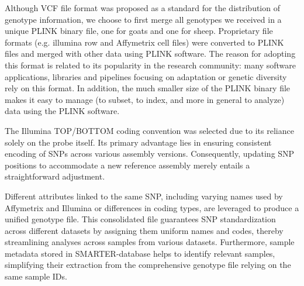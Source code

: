 \documentclass[a4paper,num-refs,gigabyte]{oup-contemporary}
\begin{document}
Although VCF\citep{Danecek2011} file format was proposed as a standard for the distribution of genotype information, we choose to first merge all genotypes we received in a unique PLINK binary file, one for goats and one for sheep. Proprietary file formats (e.g. illumina row and Affymetrix cell files) were converted to PLINK files and merged with other data using PLINK\citep{Purcell2007} software. The reason for adopting this format is related to its popularity in the research community: many software applications, libraries and pipelines focusing on adaptation or genetic diversity rely on this format. In addition, the much smaller size of the PLINK binary file makes it easy to manage (to subset, to index, and more in general to analyze) data using the PLINK software.

The Illumina TOP/BOTTOM coding convention was selected due to its reliance solely on the probe itself\citep{IlluminaTOP}. Its primary advantage lies in ensuring consistent encoding of SNPs across various assembly versions. Consequently, updating SNP positions to accommodate a new reference assembly merely entails a straightforward adjustment.

Different attributes linked to the same SNP, including varying names used by Affymetrix and Illumina or differences in coding types, are leveraged to produce a unified genotype file. This consolidated file guarantees SNP standardization across different datasets by assigning them uniform names and codes, thereby streamlining analyses across samples from various datasets. Furthermore, sample metadata stored in SMARTER-database helps to identify relevant samples, simplifying their extraction from the comprehensive genotype file relying on the same sample IDs.
\end{document}
